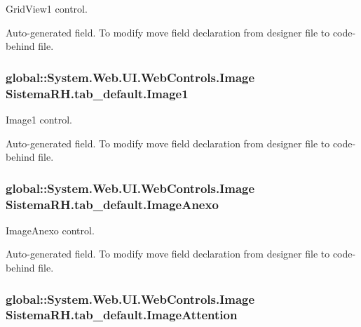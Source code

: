 GridView1 control. 

Auto-\/generated field. To modify move field declaration from designer file to code-\/behind file. \hypertarget{class_sistema_r_h_1_1tab__default_a0954d3e08f2141911994f69af31982db}{
\subsubsection[{Image1}]{\setlength{\rightskip}{0pt plus 5cm}global::System.Web.UI.WebControls.Image {\bf SistemaRH.tab\_\-default.Image1}}}
\label{class_sistema_r_h_1_1tab__default_a0954d3e08f2141911994f69af31982db}


Image1 control. 

Auto-\/generated field. To modify move field declaration from designer file to code-\/behind file. \hypertarget{class_sistema_r_h_1_1tab__default_a2d617f7626169ff53ee136b71a78b744}{
\subsubsection[{ImageAnexo}]{\setlength{\rightskip}{0pt plus 5cm}global::System.Web.UI.WebControls.Image {\bf SistemaRH.tab\_\-default.ImageAnexo}}}
\label{class_sistema_r_h_1_1tab__default_a2d617f7626169ff53ee136b71a78b744}


ImageAnexo control. 

Auto-\/generated field. To modify move field declaration from designer file to code-\/behind file. \hypertarget{class_sistema_r_h_1_1tab__default_ab080e6d7fb0497834adccfc2544fb7ac}{
\subsubsection[{ImageAttention}]{\setlength{\rightskip}{0pt plus 5cm}global::System.Web.UI.WebControls.Image {\bf SistemaRH.tab\_\-default.ImageAttention}}}
\label{class_sistema_r_h_1_1tab__default_ab080e6d7fb0497834adccfc2544fb7ac}


